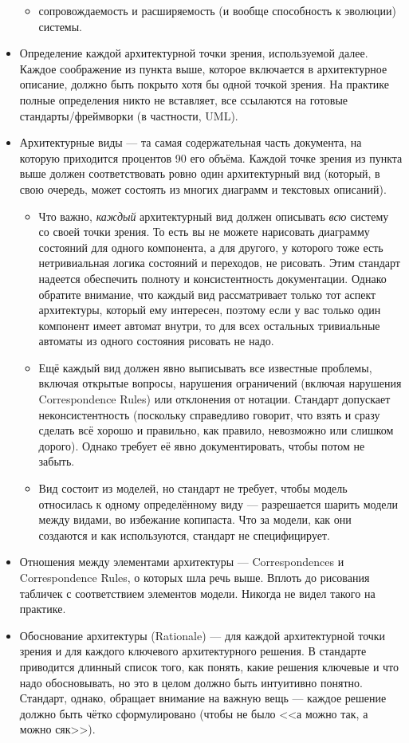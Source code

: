 \documentclass{../mcstext}
\begin{document}
\begin{itemize}
\begin{itemize}
            \item сопровождаемость и расширяемость (и вообще способность к эволюции) системы.
        \end{itemize}
    \item Определение каждой архитектурной точки зрения, используемой далее. Каждое соображение из пункта выше, которое включается в архитектурное описание, должно быть покрыто хотя бы одной точкой зрения. На практике полные определения никто не вставляет, все ссылаются на готовые стандарты/фреймворки (в частности, UML).
    \item Архитектурные виды --- та самая содержательная часть документа, на которую приходится процентов 90 его объёма. Каждой точке зрения из пункта выше должен соответствовать ровно один архитектурный вид (который, в свою очередь, может состоять из многих диаграмм и текстовых описаний).
        \begin{itemize}
            \item Что важно, \emph{каждый} архитектурный вид должен описывать \emph{всю} систему со своей точки зрения. То есть вы не можете нарисовать диаграмму состояний для одного компонента, а для другого, у которого тоже есть нетривиальная логика состояний и переходов, не рисовать. Этим стандарт надеется обеспечить полноту и консистентность документации. Однако обратите внимание, что каждый вид рассматривает только тот аспект архитектуры, который ему интересен, поэтому если у вас только один компонент имеет автомат внутри, то для всех остальных тривиальные автоматы из одного состояния рисовать не надо.
            \item Ещё каждый вид должен явно выписывать все известные проблемы, включая открытые вопросы, нарушения ограничений (включая нарушения Correspondence Rules) или отклонения от нотации. Стандарт допускает неконсистентность (поскольку справедливо говорит, что взять и сразу сделать всё хорошо и правильно, как правило, невозможно или слишком дорого). Однако требует её явно документировать, чтобы потом не забыть.
            \item Вид состоит из моделей, но стандарт не требует, чтобы модель относилась к одному определённому виду --- разрешается шарить модели между видами, во избежание копипаста. Что за модели, как они создаются и как используются, стандарт не специфицирует.
        \end{itemize}
    \item Отношения между элементами архитектуры --- Correspondences и Correspondence Rules, о которых шла речь выше. Вплоть до рисования табличек с соответствием элементов модели. Никогда не видел такого на практике.
    \item Обоснование архитектуры (Rationale) --- для каждой архитектурной точки зрения и для каждого ключевого архитектурного решения. В стандарте приводится длинный список того, как понять, какие решения ключевые и что надо обосновывать, но это в целом должно быть интуитивно понятно. Стандарт, однако, обращает внимание на важную вещь --- каждое решение должно быть чётко сформулировано (чтобы не было <<а можно так, а можно сяк>>).
    

\end{itemize}
\end{document}
